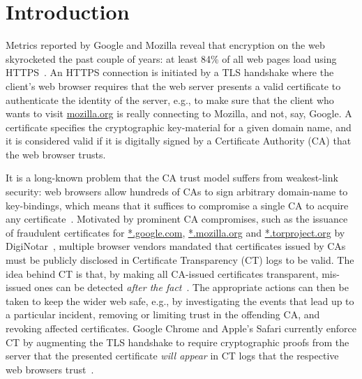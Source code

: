 \section{Introduction} \label{sec:introduction}
Metrics reported by Google and Mozilla reveal that encryption on the web
skyrocketed the past couple of years: at least 84\% of all web pages load using
HTTPS~\cite{google-metrics,mozilla-metrics}. An HTTPS connection is initiated by
a TLS handshake where the client's web browser requires that the web server
presents a valid certificate to authenticate the identity of the server, e.g.,
to make sure that the client who wants to visit \url{mozilla.org} is really
connecting to Mozilla, and not, say, Google. A certificate specifies the
cryptographic key-material for a given domain name, and it is considered valid
if it is digitally signed by a Certificate Authority (CA) that the web browser
trusts.

It is a long-known problem that the CA trust model suffers from
weakest-link security:
	web browsers allow hundreds of CAs to sign arbitrary domain-name to
		key-bindings,
	which means that it suffices to compromise a single CA to acquire any
		certificate~\cite{ca-ecosystem,https-sok}.
Motivated by prominent CA compromises, such as the issuance of fraudulent
certificates for
	\url{*.google.com},
	\url{*.mozilla.org} and
	\url{*.torproject.org}
by DigiNotar~\cite{diginotar}, multiple browser vendors mandated
that certificates issued by CAs must be publicly disclosed in Certificate
Transparency (CT) logs to be valid.  The idea behind CT is that, by making all
CA-issued certificates transparent, mis-issued ones can be detected
\emph{after the fact}~\cite{ct/a,ct,ct/bis}.  The appropriate actions can then
be taken to keep the wider web safe, e.g., by
	investigating the events that lead up to a particular incident,
	removing or limiting trust in the offending CA, and
	revoking affected certificates.
Google Chrome and Apple's Safari currently enforce CT by augmenting the TLS
handshake to require cryptographic proofs from the server that the presented
certificate \emph{will appear} in CT logs that the respective web browsers
trust~\cite{google-log-policy,apple-log-policy}.

